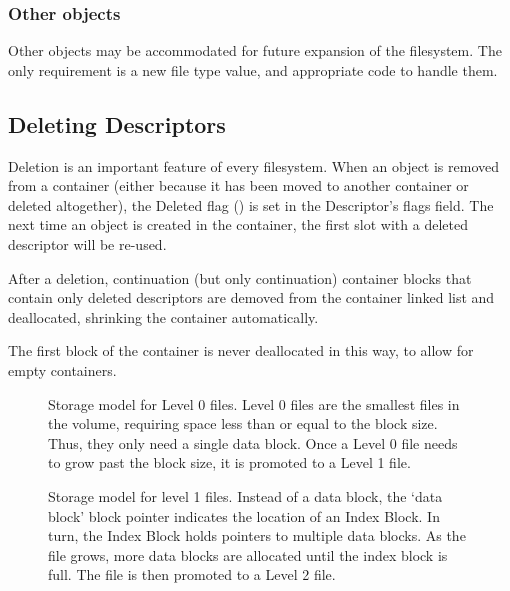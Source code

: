 \subsubsection{Other objects}

Other objects may be accommodated for future expansion of the filesystem. The
only requirement is a new file type value, and appropriate code to handle them.



\subsection{Deleting Descriptors}

Deletion is an important feature of every filesystem. When an object is removed
from a container (either because it has been moved to another container or
deleted altogether), the Deleted flag () is set in the Descriptor's
flags field. The next time an object is created in the container, the first
slot with a deleted descriptor will be re-used.

After a deletion, continuation (but only continuation) container blocks that
contain only deleted descriptors are demoved from the container linked list and
deallocated, shrinking the container automatically.

The first block of the container is never deallocated in this way, to allow for
empty containers.

\begin{figure}
 \centering

 \caption[Level 0 file structure]{\label{fig:file-level0} Storage
   model for Level 0 files. Level 0 files are the smallest files in
   the volume, requiring space less than or equal to the block
   size. Thus, they only need a single data block. Once a Level 0 file
   needs to grow past the block size, it is promoted to a Level 1
   file.}
\end{figure}


\begin{figure}
 \centering

 \caption[Level 1 file structure]{\label{fig:file-level1} Storage
   model for level 1 files. Instead of a data block, the ‘data block’
   \gls{block pointer} indicates the location of an Index Block. In
   turn, the Index Block holds pointers to multiple data blocks. As
   the file grows, more data blocks are allocated until the index
   block is full. The file is then promoted to a Level 2 file.}
\end{figure}


